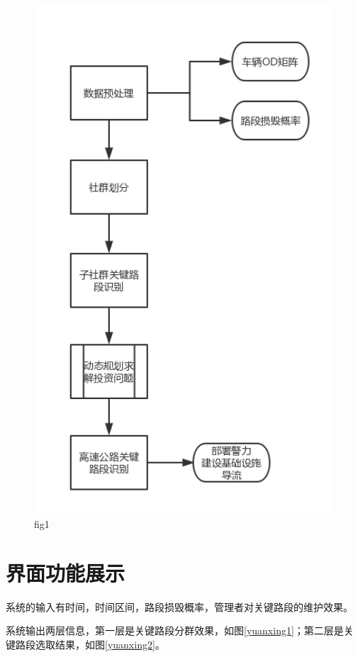 		\begin{figure}[h]
		\centering
				\begin{minipage}{0.8\linewidth}
					\centering
					\includegraphics[width=4.4in]{picture/liuchengtu}
					\caption{fig1}
					\label{fig21}
				\end{minipage}%
		\end{figure}
		
	\section{界面功能展示}

		系统的输入有时间，时间区间，路段损毁概率，管理者对关键路段的维护效果。

		系统输出两层信息，第一层是关键路段分群效果，如图\ref{yuanxing1}；第二层是关键路段选取结果，如图\ref{yuanxing2}。

